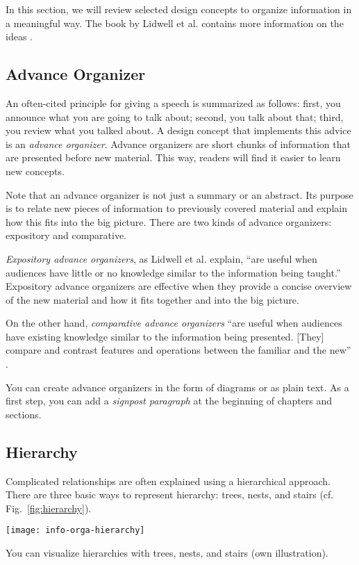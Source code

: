 In this section, we will review selected design concepts to organize information in a meaningful way. The book by Lidwell et al. contains more information on the ideas \cite{Lidwell10}.

\subsection{Advance Organizer}

An often-cited principle for giving a speech is summarized as follows: first, you announce what you are going to talk about; second, you talk about that; third, you review what you talked about. A design concept that implements this advice is an \emph{advance organizer}. Advance organizers are short chunks of information that are presented before new material. This way, readers will find it easier to learn new concepts.

Note that an advance organizer is not just a summary or an abstract. Its purpose is to relate new pieces of information to previously covered material and explain how this fits into the big picture. There are two kinds of advance organizers: expository and comparative.

\emph{Expository advance organizers}, as Lidwell et al. \cite{Lidwell10} explain, ``are useful when audiences have little or no knowledge similar to the information being taught.'' Expository advance organizers are effective when they provide a concise overview of the new material and how it fits together and into the big picture.

On the other hand, \emph{comparative advance organizers} ``are useful when audiences have existing knowledge similar to the information being presented. [They] compare and contrast features and operations between the familiar and the new'' \cite{Lidwell10}.

You can create advance organizers in the form of diagrams or as plain text. As a first step, you can add a \emph{signpost paragraph} at the beginning of chapters and sections.

\subsection{Hierarchy}

Complicated relationships are often explained using a hierarchical approach. 
There are three basic ways to represent hierarchy: trees, nests, and stairs (cf. Fig.~\ref{fig:hierarchy}).


\begin{marginfigure}
\centering
\texttt{[image: info-orga-hierarchy]}
\caption{\label{fig:hierarchy} You can visualize hierarchies with trees, nests, and stairs (own illustration).}%
\end{marginfigure}



